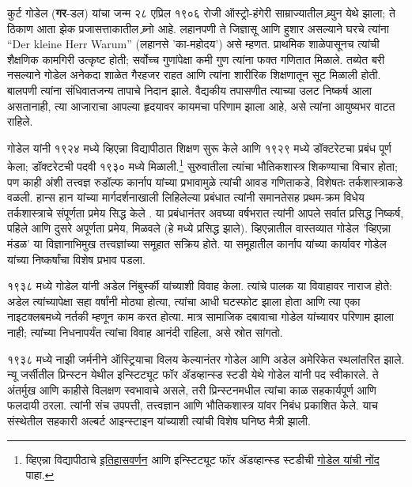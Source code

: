 \documentclass[../../../include/open-logic-section]{subfiles}
\begin{document}



कुर्ट गोडेल (\textbf{गर}-डल) यांचा जन्म २८ एप्रिल १९०६ रोजी ऑस्ट्रो-हंगेरी साम्राज्यातील ब्र्युन येथे झाला; ते ठिकाण आता झेक प्रजासत्ताकातील ब्र्नो आहे. लहानपणी ते जिज्ञासू आणि हुशार असल्याने घरचे त्यांना “Der kleine Herr Warum” (लहानसे 'का-महोदय') असे म्हणत. प्राथमिक शाळेपासूनच त्यांची शैक्षणिक कामगिरी उत्कृष्ट होती; सर्वोच्च गुणांपेक्षा कमी गुण त्यांना फक्त गणितात मिळाले. तब्येत बरी नसल्याने गोडेल अनेकदा शाळेत गैरहजर राहत आणि त्यांना शारीरिक शिक्षणातून सूट मिळाली होती. बालपणी त्यांना संधिवातजन्य तापाचे निदान झाले. वैद्यकीय तपासणीत त्याच्या उलट निष्कर्ष आला असतानाही, त्या आजाराचा आपल्या हृदयावर कायमचा परिणाम झाला आहे, असे त्यांना आयुष्यभर वाटत राहिले.

गोडेल यांनी १९२४ मध्ये व्हिएन्ना विद्यापीठात शिक्षण सुरू केले आणि १९२९ मध्ये डॉक्टरेटचा प्रबंध पूर्ण केला; डॉक्टरेटची पदवी १९३० मध्ये मिळाली.\footnote{व्हिएन्ना विद्यापीठाचे \href{https://geschichte.univie.ac.at/de/artikel/von-der-berechenbarkeit-zum-modernen-computer}{इतिहासवर्णन} आणि इन्स्टिट्यूट फॉर ॲडव्हान्स्ड स्टडीची \href{https://www.ias.edu/scholars/godel}{गोडेल यांची नोंद} पाहा.} सुरुवातीला त्यांचा भौतिकशास्त्र शिकण्याचा विचार होता; पण काही अंशी तत्त्वज्ञ रुडॉल्फ कार्नाप यांच्या प्रभावामुळे त्यांची आवड गणिताकडे, विशेषतः तर्कशास्त्राकडे वळली. हान्स हान यांच्या मार्गदर्शनाखाली लिहिलेल्या प्रबंधात त्यांनी समानतेसह प्रथम-क्रम विधेय तर्कशास्त्राचे संपूर्णता प्रमेय सिद्ध केले \citep{Godel1929}. या प्रबंधानंतर अवघ्या वर्षभरात त्यांनी आपले सर्वात प्रसिद्ध निष्कर्ष, पहिले आणि दुसरे अपूर्णता प्रमेय, मिळवले (हे \citealt{Godel1931} मध्ये प्रसिद्ध झाले). व्हिएन्नातील वास्तव्यात गोडेल 'व्हिएन्ना मंडळ' या विज्ञानाभिमुख तत्त्वज्ञांच्या समूहात सक्रिय होते. या समूहातील कार्नाप यांच्या कार्यावर गोडेल यांच्या निष्कर्षांचा विशेष प्रभाव पडला.

१९३८ मध्ये गोडेल यांनी अडेल निंबुर्स्की यांच्याशी विवाह केला. त्यांचे पालक या विवाहावर नाराज होते: अडेल त्यांच्यापेक्षा सहा वर्षांनी मोठ्या होत्या, त्यांचा आधी घटस्फोट झाला होता आणि त्या एका नाइटक्लबमध्ये नर्तकी म्हणून काम करत होत्या. मात्र सामाजिक दबावाचा गोडेल यांच्यावर परिणाम झाला नाही; त्यांच्या निधनापर्यंत त्यांचा विवाह आनंदी राहिला, असे स्रोत सांगतो.

१९३८ मध्ये नाझी जर्मनीने ऑस्ट्रियाचा विलय केल्यानंतर गोडेल आणि अडेल अमेरिकेत स्थलांतरित झाले. न्यू जर्सीतील प्रिन्स्टन येथील इन्स्टिट्यूट फॉर ॲडव्हान्स्ड स्टडी येथे गोडेल यांनी पद स्वीकारले. ते अंतर्मुख आणि काहीसे विलक्षण स्वभावाचे असले, तरी प्रिन्स्टनमधील त्यांचा काळ सहकार्यपूर्ण आणि फलदायी ठरला. त्यांनी संच उपपत्ती, तत्त्वज्ञान आणि भौतिकशास्त्र यांवर निबंध प्रकाशित केले. याच संस्थेतील सहकारी अल्बर्ट आइन्स्टाइन यांच्याशी त्यांची विशेष घनिष्ठ मैत्री झाली.
\end{document}
